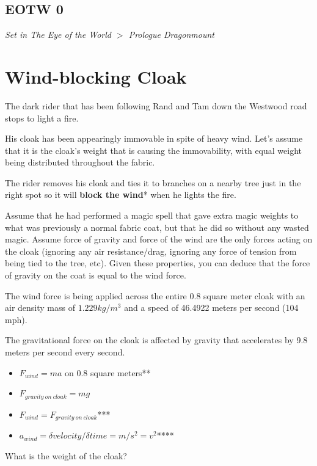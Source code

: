 \documentclass{article}
\begin{document}
\subsection*{EOTW 0}
\textit{ Set in The Eye of the World $>$ Prologue Dragonmount }  \pagebreak

\section*{Wind-blocking Cloak}

The dark rider that has been following Rand and Tam down the Westwood road
stops to light a fire.

His cloak has been appearingly immovable in spite of heavy wind. Let's assume
that it is the cloak's weight that is causing the immovability, with equal
weight being distributed throughout the fabric.

The rider removes his cloak and ties it to branches on a nearby tree
just in the right spot so it will
\textbf{block the wind}* when he lights the fire.

Assume that he had performed a magic spell that gave extra magic weights
to what was previously a normal fabric coat, but that he did so
without any wasted magic. Assume force of gravity and force of the wind
are the only forces acting on the cloak (ignoring any air resistance/drag,
ignoring any force of tension from being tied to the tree, etc). Given these
properties, you can deduce that the force of gravity on the coat
is equal to the wind force.

The wind force is being applied across the entire 0.8 square meter cloak
with an air density mass of $1.229 kg / m^{3}$ and a speed
of 46.4922 meters per second (104 mph).

The gravitational force on the cloak is affected by
gravity that accelerates by 9.8 meters per second every second.

\begin{itemize}
\item $F_{wind} = ma$ on 0.8 square meters**
\item $F_{gravity\ on\ cloak} = mg$
\item $F_{wind} = F_{gravity\ on\ cloak}$***
\item $a_{wind} = \delta velocity / \delta time = m/s^{2} = v^{2}$****
\end{itemize}

\noindent What is the weight of the cloak?\\
\end{document}
